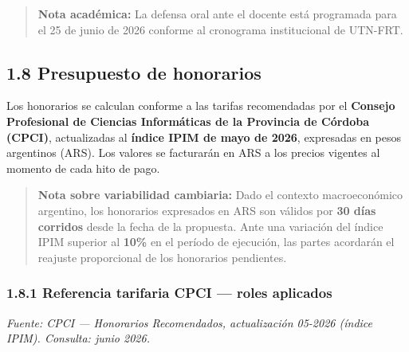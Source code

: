 \documentclass[11pt,a4paper]{article}
\begin{document}
\begin{quote}
\textbf{Nota académica:} La defensa oral ante el docente está programada para el 25 de junio de 2026 conforme al cronograma institucional de UTN-FRT.
\end{quote}

\subsection{1.8 Presupuesto de honorarios}

Los honorarios se calculan conforme a las tarifas recomendadas por el \textbf{Consejo Profesional de Ciencias Informáticas de la Provincia de Córdoba (CPCI)}, actualizadas al \textbf{índice IPIM de mayo de 2026}, expresadas en pesos argentinos (ARS). Los valores se facturarán en ARS a los precios vigentes al momento de cada hito de pago.

\begin{quote}
\textbf{Nota sobre variabilidad cambiaria:} Dado el contexto macroeconómico argentino, los honorarios expresados en ARS son válidos por \textbf{30 días corridos} desde la fecha de la propuesta. Ante una variación del índice IPIM superior al \textbf{10\%} en el período de ejecución, las partes acordarán el reajuste proporcional de los honorarios pendientes.
\end{quote}

\subsubsection{1.8.1 Referencia tarifaria CPCI — roles aplicados}


\textit{Fuente: CPCI — Honorarios Recomendados, actualización 05-2026 (índice IPIM). Consulta: junio 2026.}
\end{document}
